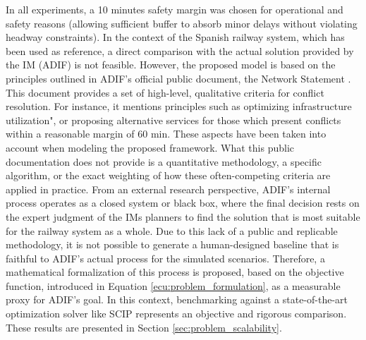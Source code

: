 \documentclass[Afour,sagev,times]{sagej}
\begin{document}
In all experiments, a 10 minutes safety margin was chosen for operational and safety reasons (allowing sufficient buffer to absorb minor delays without violating headway constraints). In the context of the Spanish railway system, which has been used as reference, a direct comparison with the actual solution provided by the \gls{IM} (ADIF) is not feasible. However, the proposed model is based on the principles outlined in ADIF's official public document, the Network Statement \cite{Adif24}. This document provides a set of high-level, qualitative criteria for conflict resolution. For instance, it mentions principles such as optimizing infrastructure utilization", or proposing alternative services for those which present conflicts within a reasonable margin of 60 min. These aspects have been taken into account when modeling the proposed framework. What this public documentation does not provide is a quantitative methodology, a specific algorithm, or the exact weighting of how these often-competing criteria are applied in practice. From an external research perspective, ADIF's internal process operates as a closed system or black box, where the final decision rests on the expert judgment of the \glspl{IM} planners to find the solution that is most suitable for the railway system as a whole.
Due to this lack of a public and replicable methodology, it is not possible to generate a human-designed baseline that is faithful to ADIF's actual process for the simulated scenarios. Therefore, a mathematical formalization of this process is proposed, based on the objective function, introduced in Equation \ref{ecu:problem_formulation}, as a measurable proxy for ADIF's goal. In this context, benchmarking against a state-of-the-art optimization solver like SCIP represents an objective and rigorous comparison. These results are presented in Section \ref{sec:problem_scalability}.
\end{document}
